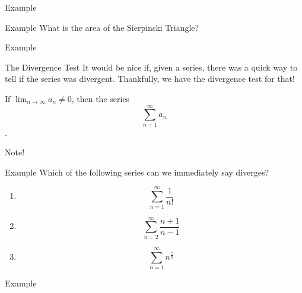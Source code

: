 \documentclass[presentation]{beamer}
\begin{document}
\begin{frame}[label={sec:orgbdfb22b}]{Example}
\end{frame}

\begin{frame}[label={sec:orgd4a7208}]{Example}
What is the area of the Sierpinski Triangle?
\vspace{10in}
\end{frame}

\begin{frame}[label={sec:orga22d791}]{Example}
\end{frame}

\begin{frame}[label={sec:orgae498f6}]{The Divergence Test}
It would be nice if, given a series, there was a quick way to tell if the series
was divergent.  Thankfully, we have the divergence test for that!

\begin{theorem}
If \(\lim_{n\rightarrow \infty} a_n \neq 0\), then the series
\[
\sum\limits_{n=1}^{\infty} a_n\]
\uline{\hspace*{1in}}.
\end{theorem}

Note!
\end{frame}

\begin{frame}[label={sec:org63164ab}]{Example}
Which of the following series can we immediately say diverges?
\begin{enumerate}
\item \[\sum\limits_{n=1}^{\infty} \frac{1}{n!}\]
\item \[\sum\limits_{n=2}^{\infty} \frac{n+1}{n-1}\]
\item \[\sum\limits_{n=1}^{\infty} n^{\frac{1}{n}}\]
\end{enumerate}
\vspace{10in}
\end{frame}

\begin{frame}[label={sec:org45d6227}]{Example}
\end{frame}
\end{document}
